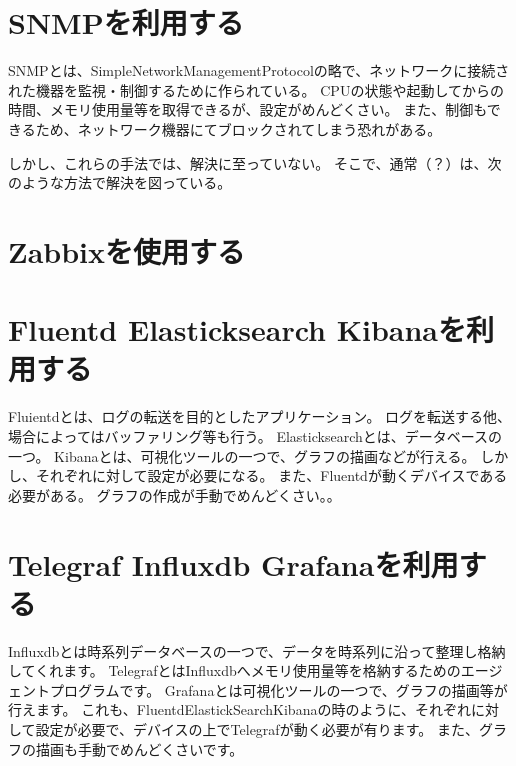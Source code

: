 \begin{comment}
NAPTとは、NetworkAddressPortTranslationの略で、外部のネットワークと内部のネットワークを分離する機能を持つ。
そのため、デバイス管理者から送信された
具体的には、内側から外側へデータを送信する際、送信元IPアドレスとポート番号を機器のIPアドレスとポート番号に変換・記憶し、
外部から内部へデータの送信があった場合、記憶していたIPアドレスとポート番号から、送信先IPアドレスとポートを書き換え、内部へ転送する
そのため、内側から始る通信は問題ないが、外側から始まる通信はブロックしてしまう。
\end{comment}

\section{SNMPを利用する}
SNMPとは、SimpleNetworkManagementProtocolの略で、ネットワークに接続された機器を監視・制御するために作られている。
CPUの状態や起動してからの時間、メモリ使用量等を取得できるが、設定がめんどくさい。
また、制御もできるため、ネットワーク機器にてブロックされてしまう恐れがある。


しかし、これらの手法では、解決に至っていない。
そこで、通常（？）は、次のような方法で解決を図っている。
\section{Zabbixを使用する}

\section{Fluentd Elasticksearch Kibanaを利用する}
Fluientdとは、ログの転送を目的としたアプリケーション。
ログを転送する他、場合によってはバッファリング等も行う。
Elasticksearchとは、データベースの一つ。
Kibanaとは、可視化ツールの一つで、グラフの描画などが行える。
しかし、それぞれに対して設定が必要になる。
また、Fluentdが動くデバイスである必要がある。
グラフの作成が手動でめんどくさい。。

\section{Telegraf Influxdb Grafanaを利用する}
Influxdbとは時系列データベースの一つで、データを時系列に沿って整理し格納してくれます。
TelegrafとはInfluxdbへメモリ使用量等を格納するためのエージェントプログラムです。
Grafanaとは可視化ツールの一つで、グラフの描画等が行えます。
これも、FluentdElastickSearchKibanaの時のように、それぞれに対して設定が必要で、デバイスの上でTelegrafが動く必要が有ります。
また、グラフの描画も手動でめんどくさいです。



